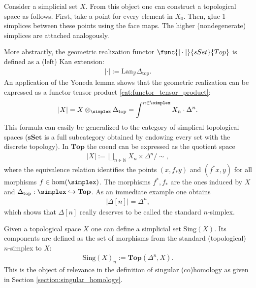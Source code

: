     \begin{example}\label{model:geometric_realization}
        Consider a simplicial set $X$. From this object one can construct a topological space as follows. First, take a point for every element in $X_0$. Then, glue 1-simplices between these points using the face maps. The higher (nondegenerate) simplices are attached analogously.

        More abstractly, the geometric realization functor $\func{|\cdot|}{sSet}{Top}$ is defined as a (left) Kan extension:
        \begin{gather}
            |\cdot| := \mathrm{Lan}_{\mathcal{Y}}\Delta_{\mathrm{top}}.
        \end{gather}
        An application of the Yoneda lemma shows that the geometric realization can be expressed as a functor tensor product \ref{cat:functor_tensor_product}:
        \begin{gather}
            |X| = X\otimes_\simplex\Delta_{\mathrm{top}}=\int^{n\in\simplex}X_n\cdot\Delta^n.
        \end{gather}
        This formula can easily be generalized to the category of simplical topological spaces ($\mathbf{sSet}$ is a full subcategory obtained by endowing every set with the discrete topology). In $\mathbf{Top}$ the coend can be expressed as the quotient space
        \begin{gather}
            |X| := \bigsqcup_{n\in\mathbb{N}}X_n\times\Delta^n/\sim,
        \end{gather}
        where the equivalence relation identifies the points $(x,f_*y)$ and $(f^*x,y)$ for all morphisms $f\in\mathrm{hom}(\simplex)$. The morphisms $f^*,f_*$ are the ones induced by $X$ and $\Delta_{\mathrm{top}}:\simplex\hookrightarrow\mathbf{Top}$.
        As an immediate example one obtains
        \begin{gather}
            |\Delta[n]| = \Delta^n,
        \end{gather}
        which shows that $\Delta[n]$ really deserves to be called the standard $n$-simplex.
    \end{example}
    \begin{example}\label{model:singular_set}
        Given a topological space $X$ one can define a simplicial set $\mathrm{Sing}(X)$. Its components are defined as the set of morphisms from the standard (topological) $n$-simplex to $X$:
        \begin{gather}
            \mathrm{Sing}(X)_n := \mathbf{Top}(\Delta^n,X).
        \end{gather}
        This is the object of relevance in the definition of singular (co)homology as given in Section \ref{section:singular_homology}.
    \end{example}

